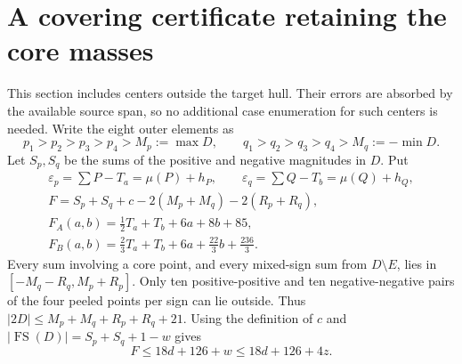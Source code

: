 \documentclass[11pt,a4paper]{article}
\newcommand{\FS}{\operatorname{FS}}
\begin{document}
\section{A covering certificate retaining the core masses}
This section includes centers outside the target hull. Their errors are
absorbed by the available source span, so no additional case enumeration
for such centers is needed.
Write the eight outer elements as
\[
 p_1>p_2>p_3>p_4>M_p:=\max D,\qquad
 q_1>q_2>q_3>q_4>M_q:=-\min D.
\]
Let $S_p,S_q$ be the sums of the positive and negative magnitudes in $D$.
Put
\begin{gather*}
 \varepsilon_p=\sum P-T_a=\mu(P)+h_P,\qquad
 \varepsilon_q=\sum Q-T_b=\mu(Q)+h_Q,\\
 F=S_p+S_q+c-2(M_p+M_q)-2(R_p+R_q),\\
 F_A(a,b)=\tfrac12T_a+T_b+6a+8b+85,\\
 F_B(a,b)=\tfrac23T_a+T_b+6a+\tfrac{22}3b+\tfrac{236}3.
\end{gather*}
Every sum involving a core point, and every mixed-sign sum from $D\setminus E$,
lies in $[-M_q-R_q,M_p+R_p]$. Only ten positive-positive and ten
negative-negative pairs of the four peeled points per sign can lie outside.
Thus $|2D|\le M_p+M_q+R_p+R_q+21$. Using the definition of $c$ and
$|\FS(D)|=S_p+S_q+1-w$ gives
\begin{equation}\label{eq:Fupper}
 \boxed{F\le18d+126+w\le18d+126+4z.}
\end{equation}
\end{document}
